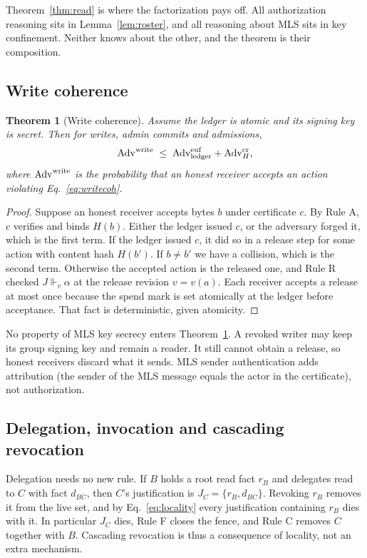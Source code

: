 \documentclass[aps,prx,reprint,superscriptaddress,nofootinbib,floatfix]{revtex4-2}
\newtheorem{theorem}{Theorem}
\theoremstyle{remark}
\newcommand{\justifies}{\Vdash}           %
\newcommand{\cut}{v}                      %
\newcommand{\Adv}{\mathrm{Adv}}
\begin{document}
Theorem~\ref{thm:read} is where the factorization pays off. All authorization reasoning sits in Lemma~\ref{lem:roster}, and all reasoning about MLS sits in key confinement. Neither knows about the other, and the theorem is their composition.

\subsection{Write coherence}

\begin{theorem}[Write coherence]\label{thm:write}
Assume the ledger is atomic and its signing key is secret. Then for writes, admin commits and admissions,
\begin{equation}
\Adv^{\rm write}\;\le\;\Adv^{\rm euf}_{\rm ledger}+\Adv^{\rm cr}_{H},
\label{eq:writebound}
\end{equation}
where $\Adv^{\rm write}$ is the probability that an honest receiver accepts an action violating Eq.~\eqref{eq:writecoh}.
\end{theorem}
\begin{proof}
Suppose an honest receiver accepts bytes $b$ under certificate $c$. By Rule A, $c$ verifies and binds $H(b)$. Either the ledger issued $c$, or the adversary forged it, which is the first term. If the ledger issued $c$, it did so in a release step for some action with content hash $H(b')$. If $b\neq b'$ we have a collision, which is the second term. Otherwise the accepted action is the released one, and Rule R checked $J\justifies_v\alpha$ at the release revision $v=\cut(a)$. Each receiver accepts a release at most once because the spend mark is set atomically at the ledger before acceptance. That fact is deterministic, given atomicity.
\end{proof}

No property of MLS key secrecy enters Theorem~\ref{thm:write}. A revoked writer may keep its group signing key and remain a reader. It still cannot obtain a release, so honest receivers discard what it sends. MLS sender authentication adds attribution (the sender of the MLS message equals the actor in the certificate), not authorization.

\subsection{Delegation, invocation and cascading revocation}\label{sec:delegation}

Delegation needs no new rule. If $B$ holds a root read fact $r_B$ and delegates read to $C$ with fact $d_{BC}$, then $C$'s justification is $J_C=\{r_B,d_{BC}\}$. Revoking $r_B$ removes it from the live set, and by Eq.~\eqref{eq:locality} every justification containing $r_B$ dies with it. In particular $J_C$ dies, Rule F closes the fence, and Rule C removes $C$ together with $B$. Cascading revocation is thus a consequence of locality, not an extra mechanism.
\end{document}
